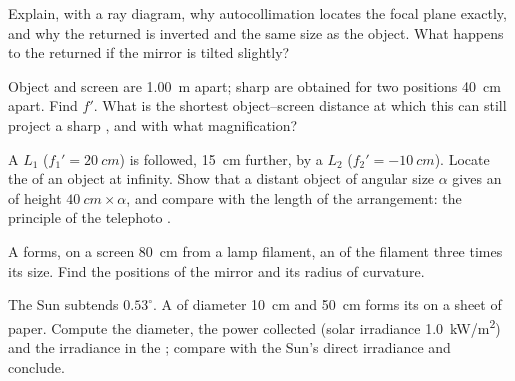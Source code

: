 \begin{exercise}[$\star\star$]\label{exo:b1:mirrors-thin-lenses:8}
Explain, with a ray diagram, why autocollimation locates the focal
plane exactly, and why the returned  is inverted and the same size
as the object. What happens to the returned  if the mirror is
tilted slightly?
\end{exercise}

\begin{exercise}[$\star\star$]\label{exo:b1:mirrors-thin-lenses:9}
Object and screen are \qty{1.00}{m} apart; sharp  are obtained
for two  positions \qty{40}{cm} apart. Find $f'$. What is the
shortest object--screen distance at which this  can still project a
sharp , and with what magnification?
\end{exercise}

\begin{exercise}[$\star\star\star$]\label{exo:b1:mirrors-thin-lenses:10}
A  $L_1$ ($f_1' = \qty{20}{cm}$) is followed, \qty{15}{cm}
further, by a  $L_2$ ($f_2' = \qty{-10}{cm}$). Locate the
 of an object at infinity. Show that a distant object of angular
size $\alpha$ gives an  of height $\qty{40}{cm}\times\alpha$, and
compare with the length of the arrangement: the principle of the
telephoto .
\end{exercise}

\begin{exercise}[$\star\star\star$]\label{exo:b1:mirrors-thin-lenses:11}
A  forms, on a screen \qty{80}{cm} from a lamp filament,
an  of the filament three times its size. Find the positions of
the mirror and its radius of curvature.
\end{exercise}

\begin{exercise}[$\star\star\star$]\label{exo:b1:mirrors-thin-lenses:12}
The Sun subtends $0.53^\circ$. A  of diameter
\qty{10}{cm} and  \qty{50}{cm} forms its  on a sheet of
paper. Compute the  diameter, the power collected (solar
irradiance \qty{1.0}{kW/m^2}) and the irradiance in the ; compare
with the Sun's direct irradiance and conclude.
\end{exercise}

